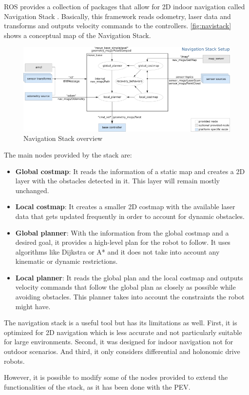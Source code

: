 ROS provides a collection of packages that allow for 2D indoor navigation called Navigation Stack . Basically, this framework reads odometry, laser data and transforms and outputs velocity commands to the controllers. \autoref{fig:navistack} shows a conceptual map of the Navigation Stack. 
\begin{figure}[htb]
  \centering
  \includegraphics[width=\linewidth]{pictures/02/navistack}
  \caption{Navigation Stack overview}
  \label{fig:navistack}
\end{figure}  

The main nodes provided by the stack are:

\begin{itemize}
  \item \textbf{Global costmap}: It reads the information of a static map and creates a 2D layer with the obstacles detected in it. This layer will remain mostly unchanged. 

  \item \textbf{Local costmap}: It creates a smaller 2D costmap with the available laser data that gets updated frequently in order to account for dynamic obstacles.
  
  \item \textbf{Global planner}: With the information from the global costmap and a desired goal, it provides a high-level plan for the robot to follow. It uses algorithms like Dijkstra or A* and it does not take into account any kinematic or dynamic restrictions.

  \item \textbf{Local planner}: It reads the global plan and the local costmap and outputs velocity commands that follow the global plan as closely as possible while avoiding obstacles. This planner takes into account the constraints the robot might have.
\end{itemize}  

The navigation stack is a useful tool but has its limitations as well. First, it is optimized for 2D navigation which is less accurate and not particularly suitable for large environments. Second, it was designed for indoor navigation not for outdoor scenarios. And third, it only considers differential and holonomic drive robots.

However, it is possible to modify some of the nodes provided to extend the functionalities of the stack, as it has been done with the PEV.

